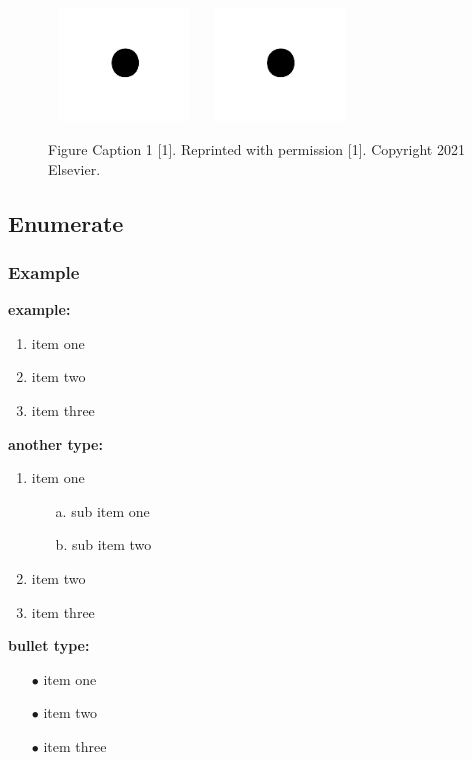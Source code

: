 \documentclass{ELSP}
\begin{document}
\begin{figure}[H]
	\centering
	\includegraphics[width=4cm,height=3cm]{fig/fig1.png}
	\includegraphics[width=4cm,height=3cm]{fig/fig1.png}
	\caption{ Figure Caption 1 {[}1{]}. Reprinted with permission {[}1{]}. Copyright 2021 Elsevier.}
\end{figure}


\subsection{Enumerate}
\subsubsection{Example}
\textbf{example:}

\begin{enumerate}[(1)]
	\setlength{\itemindent}{2em}
	\item item one
	\item item two
	\item item three
\end{enumerate}

\textbf{another type:}
\begin{enumerate}[(1)]
	\setlength{\itemindent}{2em}
	\item item one
	\begin{itemize}
		\setlength{\itemindent}{2em}
		\item[a.] sub item one
		\item[b.] sub item two
	\end{itemize}
	\item item two
	\item item three
\end{enumerate}

\textbf{bullet type:}
\begin{itemize}
	\setlength{\itemindent}{1em}
	\item[$\bullet$] item one
	\item[$\bullet$] item two
	\item[$\bullet$] item three
\end{itemize}
\end{document}
